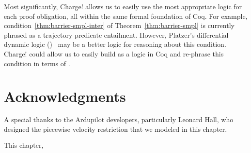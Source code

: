 Most significantly, Charge! allows us to easily use the most appropriate
logic for each proof obligation, all within the same formal foundation of
Coq. For example, condition~\eqref{thm:barrier-smpl-inter} of
Theorem~\ref{thm:barrier-smpl} is currently phrased as a trajectory
predicate entailment. However, Platzer's differential dynamic logic
(\dL{})~\cite{Platzer15substitution} may be a better logic for reasoning
about this condition. Charge! could allow us to easily build \dL{} as a
logic in Coq and re-phrase this condition in terms of \dL{}.




\section{Acknowledgments}
A special thanks to the Ardupilot developers, particularly Leonard Hall,
who designed the piecewise velocity restriction that we modeled in this
chapter.

This chapter, \expsmplack{}
